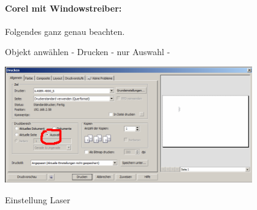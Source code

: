 \documentclass{\basedir/fablab-document}
\begin{document}
\begin{enumerate}
		\paragraph{Corel mit Windowstreiber:} Folgendes ganz genau beachten.

		Objekt anwählen - Drucken - nur Auswahl -

		{\includegraphics[height=5cm]{img/rotationseinheit/15637ec2f50b784addef4b18e06609a5e3e1a861.png}}

		Einstellung Laser


\end{enumerate}
\end{document}

